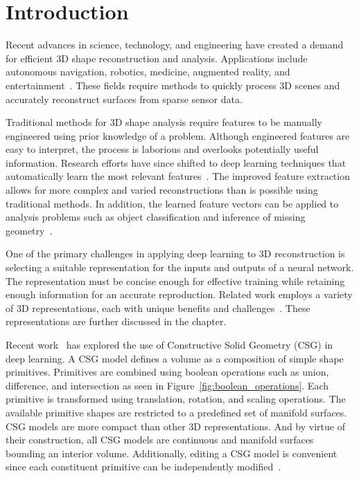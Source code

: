 
\chapter{Introduction}
\label{chap:introduction}

Recent advances in science, technology, and engineering have created a demand for efficient 3D shape reconstruction and analysis. Applications include autonomous navigation, robotics, medicine, augmented reality, and entertainment~\cite{Xiao2020, Xie2022}. These fields require methods to quickly process 3D scenes and accurately reconstruct surfaces from sparse sensor data.

Traditional methods for 3D shape analysis require features to be manually engineered using prior knowledge of a problem. Although engineered features are easy to interpret, the process is laborious and overlooks potentially useful information. Research efforts have since shifted to deep learning techniques that automatically learn the most relevant features~\cite{Bengio2013}. The improved feature extraction allows for more complex and varied reconstructions than is possible using traditional methods. In addition, the learned feature vectors can be applied to analysis problems such as object classification and inference of missing geometry~\cite{Park2019}.

One of the primary challenges in applying deep learning to 3D reconstruction is selecting a suitable representation for the inputs and outputs of a neural network. The representation must be concise enough for effective training while retaining enough information for an accurate reproduction. Related work employs a variety of 3D representations, each with unique benefits and challenges~\cite{Xiao2020}. These representations are further discussed in the  chapter.

Recent work~\cite{Sharma2018, Kania2020, Ren2021} has explored the use of Constructive Solid Geometry (CSG) in deep learning. A CSG model defines a volume as a composition of simple shape primitives. Primitives are combined using boolean operations such as union, difference, and intersection as seen in Figure~\ref{fig:boolean_operations}. Each primitive is transformed using translation, rotation, and scaling operations. The available primitive shapes are restricted to a predefined set of manifold surfaces. CSG models are more compact than other 3D representations. And by virtue of their construction, all CSG models are continuous and manifold surfaces bounding an interior volume. Additionally, editing a CSG model is convenient since each constituent primitive can be independently modified~\cite{Hughes2013}.

